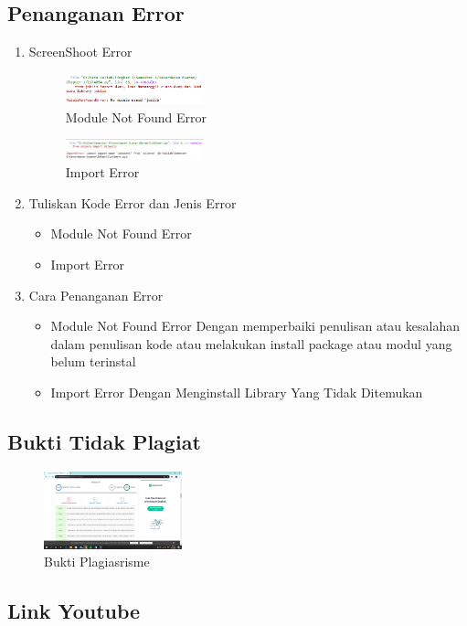 \subsection{Penanganan Error}
\begin{enumerate}
\item ScreenShoot Error
	\begin{figure}[H]
		\includegraphics[width=4cm]{figures/1174054/1/3.png}
		\centering
		\caption{Module Not Found Error}
	\end{figure}
	\begin{figure}[H]
		\includegraphics[width=4cm]{figures/1174054/1/4.png}
		\centering
		\caption{Import Error}
	\end{figure}

	\item Tuliskan Kode Error dan Jenis Error
	\begin{itemize}
		\item Module Not Found Error
		\item Import Error
	\end{itemize}
	\item Cara Penanganan Error
	\begin{itemize}
		\item Module Not Found Error
		\hfill\break
		Dengan memperbaiki penulisan atau kesalahan dalam penulisan kode atau melakukan install package atau modul yang belum terinstal
		\item Import Error
		\hfill\break
		Dengan Menginstall Library Yang Tidak Ditemukan
	\end{itemize}
\end{enumerate}


\subsection{Bukti Tidak Plagiat}
\begin{figure}[H]
	\includegraphics[width=4cm]{figures/1174054/1/plagiarisme.png}
	\centering
	\caption{Bukti Plagiasrisme}
\end{figure}

\subsection{Link Youtube}